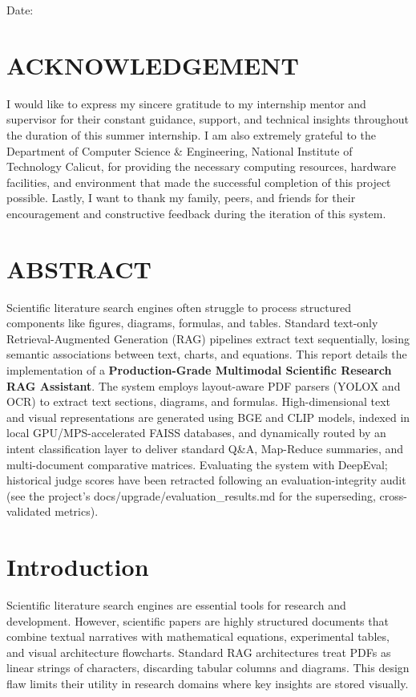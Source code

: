 \documentclass[12pt]{report}
\newenvironment{ACKNOWLEDGEMENT}{\chapter*{ACKNOWLEDGEMENT}}{}
\newenvironment{ABSTRACT}{\chapter*{ABSTRACT}}{}
\begin{document}
{\begin{flushleft}
Date:
\end{flushleft}

\newpage
\begin{ACKNOWLEDGEMENT}
I would like to express my sincere gratitude to my internship mentor and supervisor for their constant guidance, support, and technical insights throughout the duration of this summer internship. I am also extremely grateful to the Department of Computer Science \& Engineering, National Institute of Technology Calicut, for providing the necessary computing resources, hardware facilities, and environment that made the successful completion of this project possible. Lastly, I want to thank my family, peers, and friends for their encouragement and constructive feedback during the iteration of this system.
\end{ACKNOWLEDGEMENT}

\newpage 
\begin{ABSTRACT}
Scientific literature search engines often struggle to process structured components like figures, diagrams, formulas, and tables. Standard text-only Retrieval-Augmented Generation (RAG) pipelines extract text sequentially, losing semantic associations between text, charts, and equations. This report details the implementation of a \textbf{Production-Grade Multimodal Scientific Research RAG Assistant}. The system employs layout-aware PDF parsers (YOLOX and OCR) to extract text sections, diagrams, and formulas. High-dimensional text and visual representations are generated using BGE and CLIP models, indexed in local GPU/MPS-accelerated FAISS databases, and dynamically routed by an intent classification layer to deliver standard Q&A, Map-Reduce summaries, and multi-document comparative matrices. Evaluating the system with DeepEval; historical judge scores have been retracted following an evaluation-integrity audit (see the project's docs/upgrade/evaluation\_results.md for the superseding, cross-validated metrics).
\end{ABSTRACT}

\tableofcontents
{}
\listoffigures
\listoftables
\vspace{-2 em}
\printglossary[nonumberlist]


\chapter{Introduction}
Scientific literature search engines are essential tools for research and development. However, scientific papers are highly structured documents that combine textual narratives with mathematical equations, experimental tables, and visual architecture flowcharts. Standard RAG architectures treat PDFs as linear strings of characters, discarding tabular columns and diagrams. This design flaw limits their utility in research domains where key insights are stored visually.

}
\end{document}
